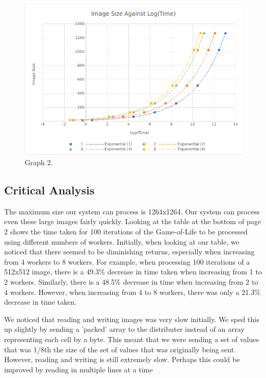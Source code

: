 \documentclass{article}
\begin{document}
\begin{figure}[H]
\centering
\includegraphics[width=15cm]{ImvsLog(Time)(BeforePow).png}
\caption{Graph 2.}
\end{figure}

\newpage


\begin{multicols}{2}

\section{Critical Analysis}
The maximum size our system can process is 1264x1264. Our system can process even these large
images fairly quickly. Looking at the table at the bottom of page 2 shows the time taken for
100 iterations of the Game-of-Life to be processed using different numbers of workers. Initially,
when looking at our table, we noticed that there seemed to be diminishing returns, especially when
increasing from 4 workers to 8 workers. For example, when processing 100 iterations of a 512x512
image, there is a 49.3\% decrease in time taken when increasing from 1 to 2 workers. Similarly,
there is a 48.5\% decrease in time when increasing from 2 to 4 workers. However, when increasing
from 4 to 8 workers, there was only a 21.3\% decrease in time taken.

\vspace{3mm}

We noticed that reading and writing images was very slow initially. We sped this up slightly by
sending a 'packed' array to the distributer instead of an array representing each cell by a byte.
This meant that we were sending a set of values that was 1/8th the size of the set of values that
was originally being sent. However, reading and writing is still extremely slow. Perhaps this
could be improved by reading in multiple lines at a time

\end{multicols}

\end{document}

